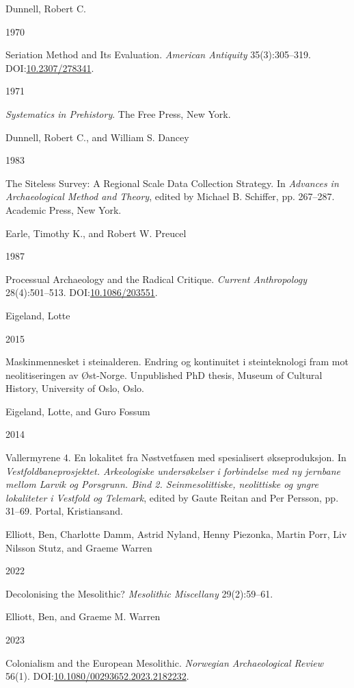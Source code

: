 \documentclass[
  12pt,
  a4paper,
  oneside]{book}
\newlength{\cslhangindent}
\newlength{\csllabelwidth}
\newlength{\cslentryspacingunit} %
\newenvironment{CSLReferences}[2] %
 {%
  \setlength{\parindent}{0pt}
  \ifodd #1
  \let\oldpar\par
  \def\par{\hangindent=\cslhangindent\oldpar}
  \fi
  \setlength{\parskip}{#2\cslentryspacingunit}
 }%
 {}
\newcommand{\CSLBlock}[1]{#1\hfill\break}
\newcommand{\CSLLeftMargin}[1]{\parbox[t]{\csllabelwidth}{#1}}
\newcommand{\CSLRightInline}[1]{\parbox[t]{\linewidth - \csllabelwidth}{#1}\break}
\begin{document}
\begin{CSLReferences}{0}{0}
\leavevmode{}%
\CSLBlock{Dunnell, Robert C.}
\CSLLeftMargin{ 1970}
\CSLRightInline{{Seriation Method and Its Evaluation}. \emph{American Antiquity} 35(3):305--319. DOI:\href{https://doi.org/10.2307/278341}{10.2307/278341}.}

\leavevmode{}%
\CSLLeftMargin{ 1971 }
\CSLRightInline{\emph{{Systematics in Prehistory}}. The Free Press, New York.}

\leavevmode{}%
\CSLBlock{Dunnell, Robert C., and William S. Dancey}
\CSLLeftMargin{ 1983}
\CSLRightInline{{The Siteless Survey: A Regional Scale Data Collection Strategy}. In \emph{{Advances in Archaeological Method and Theory}}, edited by Michael B. Schiffer, pp. 267--287. Academic Press, New York.}

\leavevmode{}%
\CSLBlock{Earle, Timothy K., and Robert W. Preucel}
\CSLLeftMargin{ 1987}
\CSLRightInline{{Processual Archaeology and the Radical Critique}. \emph{Current Anthropology} 28(4):501--513. DOI:\href{https://doi.org/10.1086/203551}{10.1086/203551}.}

\leavevmode{}%
\CSLBlock{Eigeland, Lotte}
\CSLLeftMargin{ 2015}
\CSLRightInline{{Maskinmennesket i steinalderen. Endring og kontinuitet i steinteknologi fram mot neolitiseringen av Øst-Norge}. Unpublished PhD thesis, Museum of Cultural History, University of Oslo, Oslo.}

\leavevmode{}%
\CSLBlock{Eigeland, Lotte, and Guro Fossum}
\CSLLeftMargin{ 2014}
\CSLRightInline{{Vallermyrene 4. En lokalitet fra Nøstvetfasen med spesialisert økseproduksjon}. In \emph{{Vestfoldbaneprosjektet. Arkeologiske undersøkelser i forbindelse med ny jernbane mellom Larvik og Porsgrunn. Bind 2. Seinmesolittiske, neolittiske og yngre lokaliteter i Vestfold og Telemark}}, edited by Gaute Reitan and Per Persson, pp. 31--69. Portal, Kristiansand.}

\leavevmode{}%
\CSLBlock{Elliott, Ben, Charlotte Damm, Astrid Nyland, Henny Piezonka, Martin Porr, Liv Nilsson Stutz, and Graeme Warren}
\CSLLeftMargin{ 2022}
\CSLRightInline{{Decolonising the Mesolithic?} \emph{Mesolithic Miscellany} 29(2):59--61.}

\leavevmode{}%
\CSLBlock{Elliott, Ben, and Graeme M. Warren}
\CSLLeftMargin{ 2023}
\CSLRightInline{{Colonialism and the European Mesolithic}. \emph{Norwegian Archaeological Review} 56(1). DOI:\href{https://doi.org/10.1080/00293652.2023.2182232}{10.1080/00293652.2023.2182232}.}


\end{CSLReferences}
\end{document}
